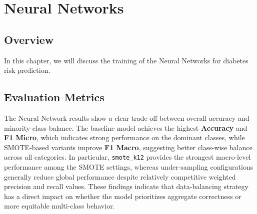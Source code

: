 \documentclass[12pt,a4paper]{report}
\begin{document}
\newpage
\chapter{Neural Networks}
\section{Overview}
In this chapter, we will discuss the training of the Neural Networks for diabetes risk prediction.
\section{Evaluation Metrics}

\begin{table}[H]
    \centering
    \caption{Neural Network Performance Metrics Across Dataset Variants}
    \label{tab:nn-metrics-summary}
    \scriptsize
\end{table}

The Neural Network results show a clear trade-off between overall accuracy and minority-class balance. The baseline model achieves the highest \textbf{Accuracy} and \textbf{F1 Micro}, which indicates strong performance on the dominant classes, while SMOTE-based variants improve \textbf{F1 Macro}, suggesting better class-wise balance across all categories. In particular, \texttt{smote\_k12} provides the strongest macro-level performance among the SMOTE settings, whereas under-sampling configurations generally reduce global performance despite relatively competitive weighted precision and recall values. These findings indicate that data-balancing strategy has a direct impact on whether the model prioritizes aggregate correctness or more equitable multi-class behavior.
\end{document}

